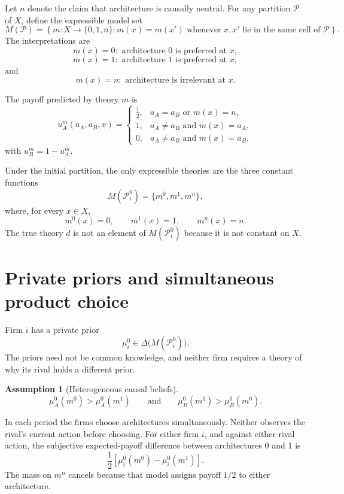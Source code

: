 \documentclass[11pt]{article}
\newtheorem{assumption}{Assumption}
\begin{document}
Let $n$ denote the claim that architecture is causally neutral.  For any partition $\mathcal P$ of $X$, define the expressible model set
\begin{equation}
M(\mathcal P)
=
\left\{
m:X\longrightarrow\{0,1,n\}:
m(x)=m(x')
\text{ whenever }x,x'\text{ lie in the same cell of }\mathcal P
\right\}.
\label{eq:model-space}
\end{equation}
The interpretations are
\[
m(x)=0:
\text{ architecture 0 is preferred at }x,
\]
\[
m(x)=1:
\text{ architecture 1 is preferred at }x,
\]
and
\[
m(x)=n:
\text{ architecture is irrelevant at }x.
\]

The payoff predicted by theory $m$ is
\begin{equation}
u_A^m(a_A,a_B,x)=
\begin{cases}
\frac12, & a_A=a_B\text{ or }m(x)=n,\\
1, & a_A\neq a_B\text{ and }m(x)=a_A,\\
0, & a_A\neq a_B\text{ and }m(x)=a_B,
\end{cases}
\label{eq:subjective-payoff}
\end{equation}
with $u_B^m=1-u_A^m$.

Under the initial partition, the only expressible theories are the three constant functions
\[
M(\mathcal P_i^0)=\{m^0,m^1,m^n\},
\]
where, for every $x\in X$,
\[
m^0(x)=0,
\qquad
m^1(x)=1,
\qquad
m^n(x)=n.
\]
The true theory $d$ is not an element of $M(\mathcal P_i^0)$ because it is not constant on $X$.

\section{Private priors and simultaneous product choice}

Firm $i$ has a private prior
\[
\mu_i^0\in\Delta\big(M(\mathcal P_i^0)\big).
\]
The priors need not be common knowledge, and neither firm requires a theory of why its rival holds a different prior.

\begin{assumption}[Heterogeneous causal beliefs]
\[
\mu_A^0(m^0)>\mu_A^0(m^1)
\qquad\text{and}\qquad
\mu_B^0(m^1)>\mu_B^0(m^0).
\]
\end{assumption}

In each period the firms choose architectures simultaneously.  Neither observes the rival's current action before choosing.  For either firm $i$, and against either rival action, the subjective expected-payoff difference between architectures 0 and 1 is
\begin{equation}
\frac12\left[\mu_i^0(m^0)-\mu_i^0(m^1)\right].
\label{eq:dominance-difference}
\end{equation}
The mass on $m^n$ cancels because that model assigns payoff $1/2$ to either architecture.
\end{document}
